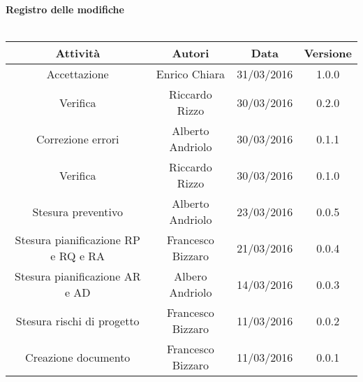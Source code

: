 \vspace{1cm}
   {\fontsize{15pt}{16pt}\selectfont \textbf{Registro delle modifiche}}\\ \\

\bgroup
\def\arraystretch{1.6}
\begin{tabular}{| c | c | c | c |}
\hline
\textbf{Attività} & \textbf{Autori} & \textbf{Data} & \textbf{Versione}\\ \hline \hline


Accettazione & Enrico Chiara & 31/03/2016 & 1.0.0 \\ \hline 

Verifica & Riccardo Rizzo & 30/03/2016 & 0.2.0 \\ \hline

Correzione errori & Alberto Andriolo & 30/03/2016 & 0.1.1 \\ \hline

Verifica & Riccardo Rizzo & 30/03/2016 & 0.1.0 \\ \hline 

Stesura preventivo & Alberto Andriolo & 23/03/2016 & 0.0.5 \\ \hline 

Stesura pianificazione RP e RQ e RA & Francesco Bizzaro & 21/03/2016 & 0.0.4 
\\ \hline

Stesura pianificazione AR e AD & Albero Andriolo & 14/03/2016 & 0.0.3 \\ 
\hline 

Stesura rischi di progetto & Francesco Bizzaro & 11/03/2016 & 0.0.2 \\ \hline 

Creazione documento & Francesco Bizzaro & 11/03/2016 & 0.0.1 \\ \hline 


\end{tabular}
\egroup
\newpage